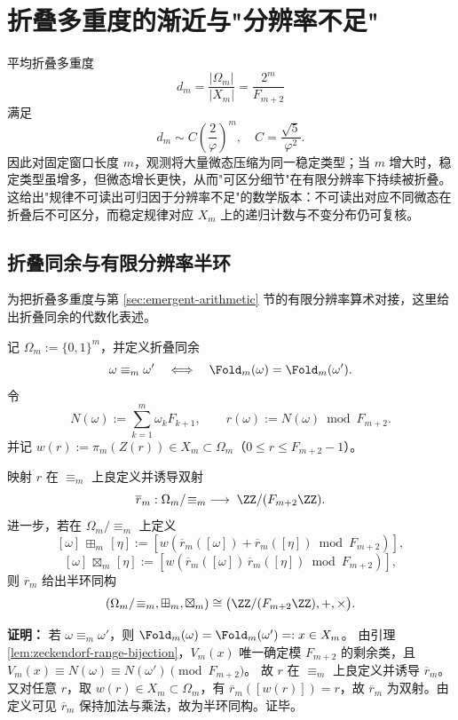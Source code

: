 \section{折叠多重度的渐近与"分辨率不足"}\label{app:fold-multiplicity}

平均折叠多重度
\[
d_m=\frac{|\Omega_m|}{|X_m|}=\frac{2^m}{F_{m+2}}
\]
满足
\[
d_m\sim C\left(\frac{2}{\varphi}\right)^m,\quad C=\frac{\sqrt5}{\varphi^2}.
\]
因此对固定窗口长度 $m$，观测将大量微态压缩为同一稳定类型；当 $m$ 增大时，稳定类型虽增多，但微态增长更快，从而"可区分细节"在有限分辨率下持续被折叠。这给出"规律不可读出可归因于分辨率不足"的数学版本：不可读出对应不同微态在折叠后不可区分，而稳定规律对应 $X_m$ 上的递归计数与不变分布仍可复核。

\subsection{折叠同余与有限分辨率半环}
为把折叠多重度与第 \ref{sec:emergent-arithmetic} 节的有限分辨率算术对接，这里给出折叠同余的代数化表述。

\begin{definition}[折叠同余与值模映射]
记 $\Omega_m:=\{0,1\}^m$，并定义折叠同余
\[
\omega\equiv_m\omega'\quad\Longleftrightarrow\quad\Fold_m(\omega)=\Fold_m(\omega').
\]
令
\[
N(\omega):=\sum_{k=1}^m \omega_k F_{k+1},
\qquad
r(\omega):=N(\omega)\bmod F_{m+2}.
\]
并记 $w(r):=\pi_m(Z(r))\in X_m\subset\Omega_m$（$0\le r\le F_{m+2}-1$）。
\end{definition}

\begin{theorem}[折叠同余的模半环表示]
\label{thm:fold-congruence-mod-semirings}
映射 $r$ 在 $\equiv_m$ 上良定义并诱导双射
\[
\overline r_m:\Omega_m/\!\equiv_m\;\longrightarrow\;\ZZ/(F_{m+2}\ZZ).
\]
进一步，若在 $\Omega_m/\!\equiv_m$ 上定义
\[
[\omega]\,\boxplus_m\,[\eta]:=[w(\overline r_m([\omega])\!+\!\overline r_m([\eta])\bmod F_{m+2})],
\]
\[
[\omega]\,\boxtimes_m\,[\eta]:=[w(\overline r_m([\omega])\,\overline r_m([\eta])\bmod F_{m+2})],
\]
则 $\overline r_m$ 给出半环同构
\[
(\Omega_m/\!\equiv_m,\boxplus_m,\boxtimes_m)\cong\bigl(\ZZ/(F_{m+2}\ZZ),+,\times\bigr).
\]
\end{theorem}

\textbf{证明：}
若 $\omega\equiv_m\omega'$，则 $\Fold_m(\omega)=\Fold_m(\omega')=:x\in X_m$。
由引理 \ref{lem:zeckendorf-range-bijection}，$V_m(x)$ 唯一确定模 $F_{m+2}$ 的剩余类，且
\(V_m(x)\equiv N(\omega)\equiv N(\omega')\pmod{F_{m+2}}\)。
故 $r$ 在 $\equiv_m$ 上良定义并诱导 $\overline r_m$。又对任意 $r$，取 $w(r)\in X_m\subset\Omega_m$，有
\(\overline r_m([w(r)])=r\)，故 $\overline r_m$ 为双射。由定义可见 $\overline r_m$ 保持加法与乘法，故为半环同构。证毕。


